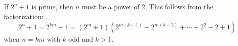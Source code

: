 If $2^n + 1$ is prime, then $n$ must be a power of 2. This follows from the factorization:
$$2^n + 1 = 2^{km} + 1 = (2^m + 1)(2^{m(k-1)} - 2^{m(k-2)} + \cdots + 2^2 - 2 + 1)$$
when $n = km$ with $k$ odd and $k > 1$.

